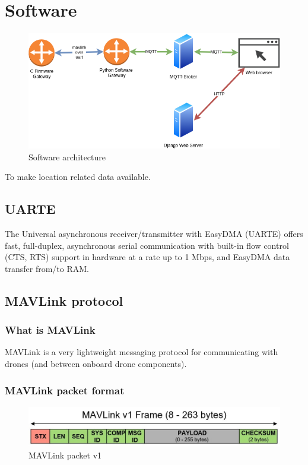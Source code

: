 \documentclass[\main/main.tex]{subfiles}
\begin{document}
\graphicspath{{img/}{05_software/img/}}

\chapter{Software}
\begin{figure}[H]
    \begin{center}
        \includegraphics[scale=0.6]{software_architecture.png}
    \end{center}
    \caption{Software architecture}
    \label{fig:software_architecture}
\end{figure}

To make location related data available.

\section{UARTE}
The Universal asynchronous receiver/transmitter with EasyDMA (UARTE) offers fast, full-duplex, asynchronous serial communication with built-in flow control (CTS, RTS) support in hardware at a rate up to 1 Mbps, and EasyDMA data transfer from/to RAM.
\cite{nordic-semiconductor:nRF52832_PS_v1.4}

\section{MAVLink protocol}

\subsection*{What is MAVLink}
MAVLink is a very lightweight messaging protocol for communicating with drones (and between onboard drone components). \cite{web_mavlink}

\subsection*{MAVLink packet format}
\begin{figure}[H]
    \begin{center}
        \includegraphics[scale=1.2]{packet_mavlink_v1.jpg}
    \end{center}
    \caption{MAVLink packet v1}
    \label{fig:packet_mavlink_v1}
\end{figure}
\end{document}
